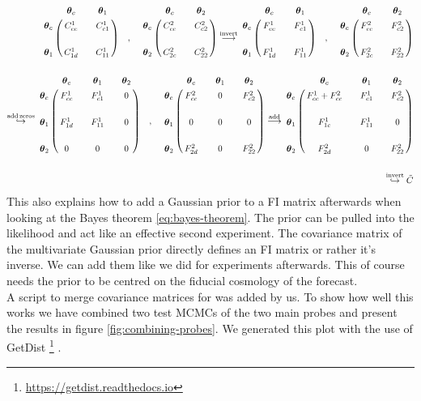 \documentclass[../main.tex]{subfiles}
\begin{document}
\begin{align*}
    \bordermatrix{~ & \boldsymbol{\theta}_c && \boldsymbol{\theta}_1 \cr
    \boldsymbol{\theta}_c &C^1_{cc}&& C^1_{c1}\cr
    \cr
    \boldsymbol{\theta}_1 &C^1_{1d}&& C^1_{11}\cr } \quad ,\quad 
    \bordermatrix{~ & \boldsymbol{\theta}_c && \boldsymbol{\theta}_2 \cr
    \boldsymbol{\theta}_c &C^2_{cc}&& C^2_{c2}\cr
    \cr
    \boldsymbol{\theta}_2 &C^2_{2c}&& C^2_{22}\cr } \overset{\mathrm{invert}}{\longrightarrow}
    \bordermatrix{~ & \boldsymbol{\theta}_c && \boldsymbol{\theta}_1 \cr
    \boldsymbol{\theta}_c &F^1_{cc}&& F^1_{c1}\cr
    \cr
    \boldsymbol{\theta}_1 &F^1_{1d}&& F^1_{11}\cr } \quad ,\quad 
    \bordermatrix{~ & \boldsymbol{\theta}_c && \boldsymbol{\theta}_2 \cr
    \boldsymbol{\theta}_c &F^2_{cc}&& F^2_{c2}\cr
    \cr
    \boldsymbol{\theta}_2 &F^2_{2c}&& F^2_{22}\cr }\\
    \\
    \overset{\mathrm{add\,zeros}}{\hookrightarrow}
    \bordermatrix{~ & \boldsymbol{\theta}_c && \boldsymbol{\theta}_1  &&\boldsymbol{\theta}_2 \cr
    \boldsymbol{\theta}_c &F^1_{cc}&& F^1_{c1} && 0\cr
    \cr
    \boldsymbol{\theta}_1 &F^1_{1d}&& F^1_{11}&& 0\cr 
    \cr
    \boldsymbol{\theta}_2& 0&&0&&0} \quad,\quad 
    \bordermatrix{~ & \boldsymbol{\theta}_c && \boldsymbol{\theta}_1  &&\boldsymbol{\theta}_2 \cr
    \boldsymbol{\theta}_c &F^2_{cc}&&0  && F^2_{c2}\cr
    \cr
    \boldsymbol{\theta}_1 &0&& 0&& 0\cr 
    \cr
    \boldsymbol{\theta}_2& F^2_{2d}&&0&&F^2_{22}} \overset{\mathrm{add}}{\longrightarrow}
    \bordermatrix{~ & \boldsymbol{\theta}_c && \boldsymbol{\theta}_1  &&\boldsymbol{\theta}_2 \cr
    \boldsymbol{\theta}_c &F^1_{cc}+F^2_{cc}&&F^1_{c1}  && F^2_{c2}\cr
    \cr
    \boldsymbol{\theta}_1 &F^1_{1c}&& F^1_{11}&& 0\cr 
    \cr
    \boldsymbol{\theta}_2& F^2_{2d}&&0&&F^2_{22}}\\
    \\
    \overset{\mathrm{invert}}{\hookrightarrow} \tilde{C}
\end{align*}
This also explains how to add a Gaussian prior to a FI matrix afterwards when looking at the Bayes theorem \ref{eq:bayes-theorem}. The prior can be pulled into the likelihood and act like an effective second experiment. The covariance matrix of the multivariate Gaussian prior directly defines an FI matrix or rather it's inverse. We can add them like we did for experiments afterwards. This of course needs the prior to be centred on the fiducial cosmology of the forecast.\\
A script to merge covariance matrices for \montepython was added by us. To show how well this works we have combined two test MCMCs of the two main \Euclid probes and present the results in figure \ref{fig:combining-probes}. We generated this plot with the use of GetDist \footnote{\href{https://getdist.readthedocs.io}{https://getdist.readthedocs.io}} \cite{Lewis:2019xzd}.
\end{document}

